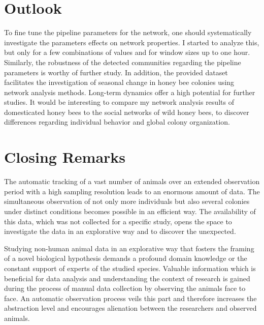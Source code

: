\section{Outlook}
To fine tune the pipeline parameters for the network, one should systematically investigate the parameters effects on network properties.
I started to analyze this, but only for a few combinations of values and for window sizes up to one hour.
Similarly, the robustness of the detected communities regarding the pipeline parameters is worthy of further study.
In addition, the provided dataset facilitates the investigation of seasonal change in honey bee colonies using network analysis methods. Long-term dynamics offer a high potential for further studies. It would be interesting to compare my network analysis results of domesticated honey bees to the social networks of wild honey bees, to discover differences regarding individual behavior and global colony organization.

\section{Closing Remarks}
The automatic tracking of a vast number of animals over an extended observation period with a high sampling resolution leads to an enormous amount of data.
The simultaneous observation of not only more individuals but also several colonies under distinct conditions becomes possible in an efficient way.
The availability of this data, which was not collected for a specific study, opens the space to investigate the data in an explorative way and to discover the unexpected.

Studying non-human animal data in an explorative way that fosters the framing of a novel biological hypothesis demands a profound domain knowledge or the constant support of experts of the studied species.
Valuable information which is beneficial for data analysis and understanding the context of research is gained during the process of manual data collection by observing the animals face to face.
An automatic observation process veils this part and therefore increases the abstraction level and encourages alienation between the researchers and observed animals.

